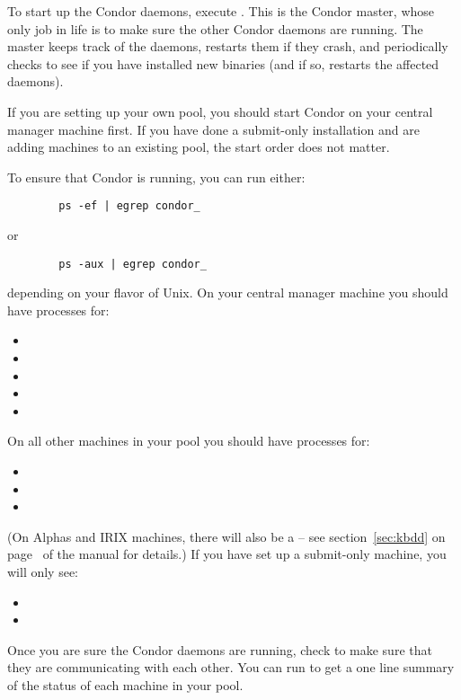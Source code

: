 To start up the Condor daemons, execute
.  This is the Condor master, whose
only job in life is to make sure the other Condor daemons are running.
The master keeps track of the daemons, restarts them if they crash,
and periodically checks to see if you have installed new binaries (and
if so, restarts the affected daemons).

If you are setting up your own pool, you should start Condor on your
central manager machine first.  If you have done a submit-only
installation and are adding machines to an existing pool,
the start order does not
matter.

To ensure that Condor is running, you can run either:
\begin{verbatim}
        ps -ef | egrep condor_
\end{verbatim}
or
\begin{verbatim}
        ps -aux | egrep condor_
\end{verbatim}
depending on your flavor of Unix.  On your central manager machine you
should have processes for:
\begin{itemize}
	\item {}
	\item {}
	\item {}
	\item {}
	\item {}
\end{itemize}
On all other machines in your pool you should have processes for:
\begin{itemize}
	\item {}
	\item {}
	\item {}
\end{itemize}
(\Note On Alphas and IRIX machines, there will also be a
	 -- see section~\ref{sec:kbdd} on
	page~\pageref{sec:kbdd} of the manual for details.)  If you
	have set up a submit-only machine, you will only see:
\begin{itemize}
	\item {}
	\item {}
\end{itemize}

Once you are sure the Condor daemons are running, check to make sure
that they are communicating with each other.  You can run
 to get a one line summary of the status of each
machine in your pool.

